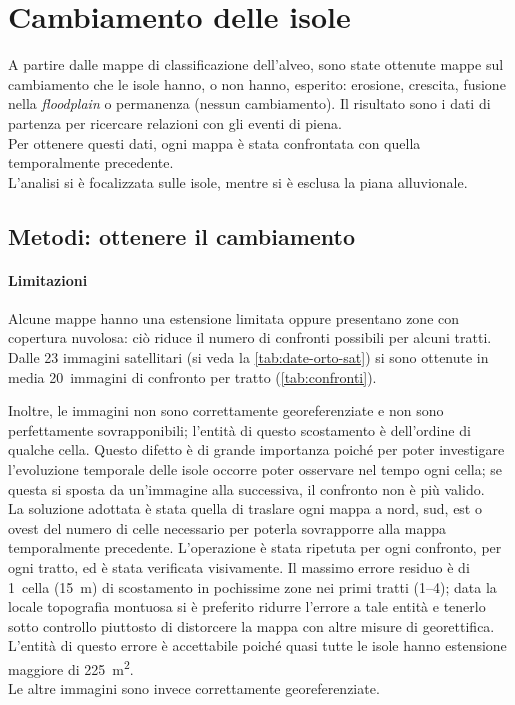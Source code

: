 \section{Cambiamento delle isole}
\label{sec:cambiamento}
A partire dalle mappe di classificazione dell'alveo, sono state ottenute mappe sul cambiamento che le isole hanno, o non hanno, esperito: erosione, crescita, fusione nella \emph{floodplain} o permanenza (nessun cambiamento).
Il risultato sono i dati di partenza per ricercare relazioni con gli eventi di piena.
\\
Per ottenere questi dati, ogni mappa è stata confrontata con quella temporalmente precedente.
\\
L'analisi si è focalizzata sulle isole, mentre si è esclusa la piana alluvionale.

\subsection{Metodi: ottenere il cambiamento}
\paragraph{Limitazioni} \label{par:camb-limiti}
Alcune mappe hanno una estensione limitata oppure presentano zone con copertura nuvolosa: ciò riduce il numero di confronti possibili per alcuni tratti. 
Dalle 23 immagini satellitari (si veda la \cref{tab:date-orto-sat}) si sono ottenute in media 20~immagini di confronto per tratto (\cref{tab:confronti}).

Inoltre, le immagini \AST{} non sono correttamente georeferenziate e non sono perfettamente sovrapponibili; l'entità di questo scostamento è dell'ordine di qualche cella.
Questo difetto è di grande importanza poiché per poter investigare l'evoluzione temporale delle isole occorre poter osservare nel tempo ogni cella; se questa si sposta da un'immagine alla successiva, il confronto non è più valido.
\\
La soluzione adottata è stata quella di traslare ogni mappa a nord, sud, est o ovest del numero di celle necessario per poterla sovrapporre alla mappa temporalmente precedente.
L'operazione è stata ripetuta per ogni confronto, per ogni tratto, ed è stata verificata visivamente.
Il massimo errore residuo è di 1~cella (\SI{15}{\m}) di scostamento in pochissime zone nei primi tratti (\numrange[range-phrase={ - }]{1}{4}); data la locale topografia montuosa si è preferito ridurre l'errore a tale entità e tenerlo sotto controllo piuttosto di distorcere la mappa con altre misure di georettifica.
L'entità di questo errore è accettabile poiché quasi tutte le isole hanno estensione maggiore di \SI{225}{\m\tothe{2}}.
\\
Le altre immagini sono invece correttamente georeferenziate.

